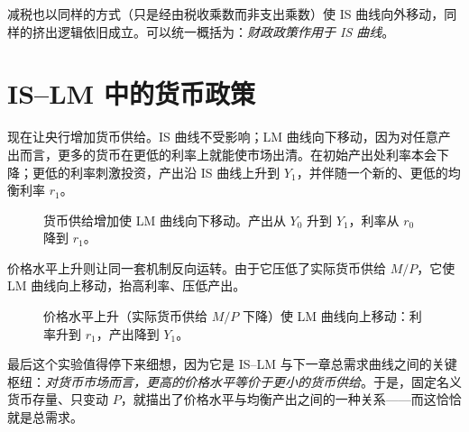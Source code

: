 
减税也以同样的方式（只是经由税收乘数而非支出乘数）使 IS 曲线向外移动，同样的挤出逻辑依旧成立。可以统一概括为：\emph{财政政策作用于 IS 曲线}。

\section{IS--LM 中的货币政策}

现在让央行增加货币供给。IS 曲线不受影响；LM 曲线向下移动，因为对任意产出而言，更多的货币在更低的利率上就能使市场出清。在初始产出处利率本会下降；更低的利率刺激投资，产出沿 IS 曲线上升到 $Y_1$，并伴随一个新的、更低的均衡利率 $r_1$。

\begin{figure}[h]
\centering

\caption{货币供给增加使 LM 曲线向下移动。产出从 $Y_0$ 升到 $Y_1$，利率从 $r_0$ 降到 $r_1$。}
\label{fig:macro-23}
\end{figure}

价格水平上升则让同一套机制反向运转。由于它压低了实际货币供给 $M/P$，它使 LM 曲线向上移动，抬高利率、压低产出。

\begin{figure}[h]
\centering

\caption{价格水平上升（实际货币供给 $M/P$ 下降）使 LM 曲线向上移动：利率升到 $r_1$，产出降到 $Y_1$。}
\label{fig:macro-24}
\end{figure}

最后这个实验值得停下来细想，因为它是 IS--LM 与下一章总需求曲线之间的关键枢纽：\emph{对货币市场而言，更高的价格水平等价于更小的货币供给}。于是，固定名义货币存量、只变动 $P$，就描出了价格水平与均衡产出之间的一种关系——而这恰恰就是总需求。

